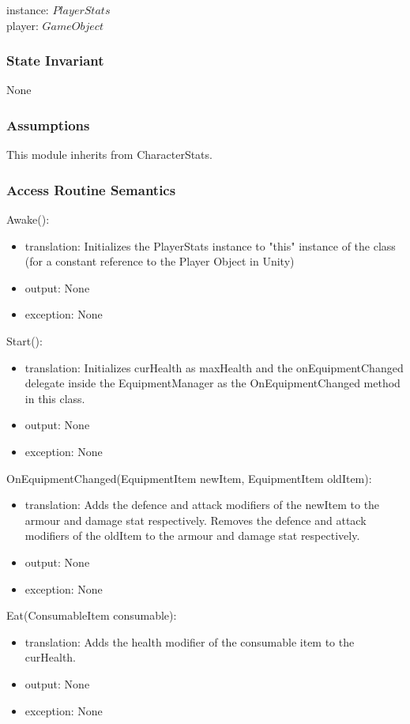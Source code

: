 \documentclass[12pt]{article}
\begin{document}
instance: $PlayerStats$ \\
player: $GameObject$ \\

\subsubsection* {State Invariant}

None

\subsubsection* {Assumptions}

This module inherits from CharacterStats.

\subsubsection* {Access Routine Semantics}

\noindent Awake():
\begin{itemize}
\item translation: Initializes the PlayerStats instance to "this" instance of the class (for a constant reference to the Player Object in Unity)
\item output: None
\item exception: None
\end{itemize}

\noindent Start():
\begin{itemize}
\item translation: Initializes curHealth as maxHealth and the onEquipmentChanged delegate inside the EquipmentManager as the OnEquipmentChanged method in this class.
\item output: None
\item exception: None
\end{itemize}

\noindent OnEquipmentChanged(EquipmentItem newItem, EquipmentItem oldItem):
\begin{itemize}
\item translation: Adds the defence and attack modifiers of the newItem to the armour and damage stat respectively.  Removes the defence and attack modifiers of the oldItem to the armour and damage stat respectively. 
\item output: None
\item exception: None
\end{itemize}

\noindent Eat(ConsumableItem consumable):
\begin{itemize}
\item translation: Adds the health modifier of the consumable item to the curHealth.
\item output: None
\item exception: None
\end{itemize}
\end{document}
